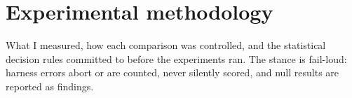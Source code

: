 \section{Experimental methodology}\label{ch:methodology}

What I measured, how each comparison was controlled, and the statistical
decision rules committed to before the experiments ran. The stance is
fail-loud: harness errors abort or are counted, never silently scored, and
null results are reported as findings.






